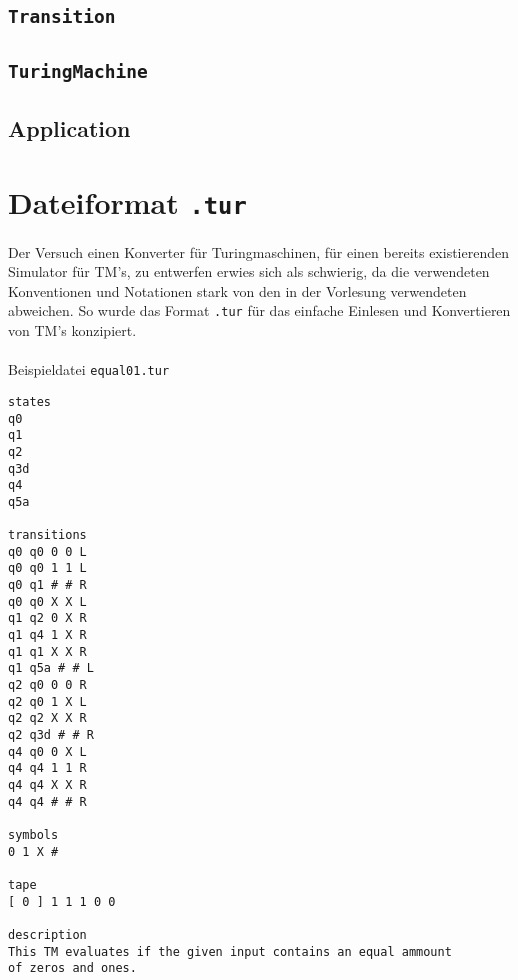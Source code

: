 \documentclass[10pt, a4paper]{article}
\newcommand{\ilc}{\texttt}
\begin{document}
\subsection*{\ilc{Transition}}
\subsection*{\ilc{TuringMachine}}

\subsection*{Application}


\section*{Dateiformat \ilc{.tur}}
\paragraph*{}
Der Versuch einen Konverter für Turingmaschinen, für einen bereits existierenden Simulator für TM's, zu entwerfen erwies sich als schwierig, da die verwendeten Konventionen und Notationen stark von den in der Vorlesung verwendeten abweichen. So wurde das Format \ilc{.tur} für das einfache Einlesen und Konvertieren von TM's konzipiert.\par

\paragraph*{}
\begin{center}
Beispieldatei \texttt{equal01.tur}
\end{center}
\begin{tiny}
\begin{tcolorbox}
\begin{verbatim}
states
q0
q1
q2
q3d
q4
q5a

transitions
q0 q0 0 0 L
q0 q0 1 1 L
q0 q1 # # R
q0 q0 X X L
q1 q2 0 X R
q1 q4 1 X R
q1 q1 X X R
q1 q5a # # L
q2 q0 0 0 R
q2 q0 1 X L
q2 q2 X X R
q2 q3d # # R
q4 q0 0 X L
q4 q4 1 1 R
q4 q4 X X R
q4 q4 # # R

symbols
0 1 X #

tape
[ 0 ] 1 1 1 0 0

description
This TM evaluates if the given input contains an equal ammount
of zeros and ones. 
\end{verbatim}
\end{tcolorbox}
\end{tiny}
\par
\end{document}

